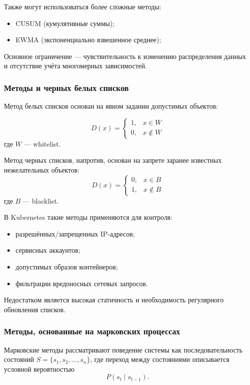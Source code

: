 Также могут использоваться более сложные методы:
\begin{itemize}
    \item CUSUM (кумулятивные суммы);
    \item EWMA (экспоненциально взвешенное среднее);
\end{itemize}

Основное ограничение — чувствительность к изменению распределения данных и отсутствие учёта многомерных зависимостей.

\subsubsection{Методы и черных белых списков}

Метод белых списков основан на явном задании допустимых объектов:

$$
D(x) =
\begin{cases}
1, & x \in W \\
0, & x \notin W
\end{cases}
$$
где \(W\) — whitelist.

Метод черных списков, напротив, основан на запрете заранее известных нежелательных объектов:
\nopagebreak
$$
D(x) =
\begin{cases}
0, & x \in B \\
1, & x \notin B
\end{cases}
$$
где \(B\) — blacklist.

В Kubernetes такие методы применяются для контроля:

\begin{itemize}
    \item разрешённых/запрещенных IP-адресов;
    \item сервисных аккаунтов;
    \item допустимых образов контейнеров;
    \item фильтрации вредоносных сетевых запросов.
\end{itemize}

Недостатком является высокая статичность и необходимость регулярного обновления списков.

\subsubsection{Методы, основанные на марковских процессах}

Марковские методы рассматривают поведение системы как последовательность состояний \( S = \{s_1, s_2, \dots, s_n\} \), где переход между состояниями описывается условной вероятностью
$$
P(s_t \mid s_{t-1}).
$$


